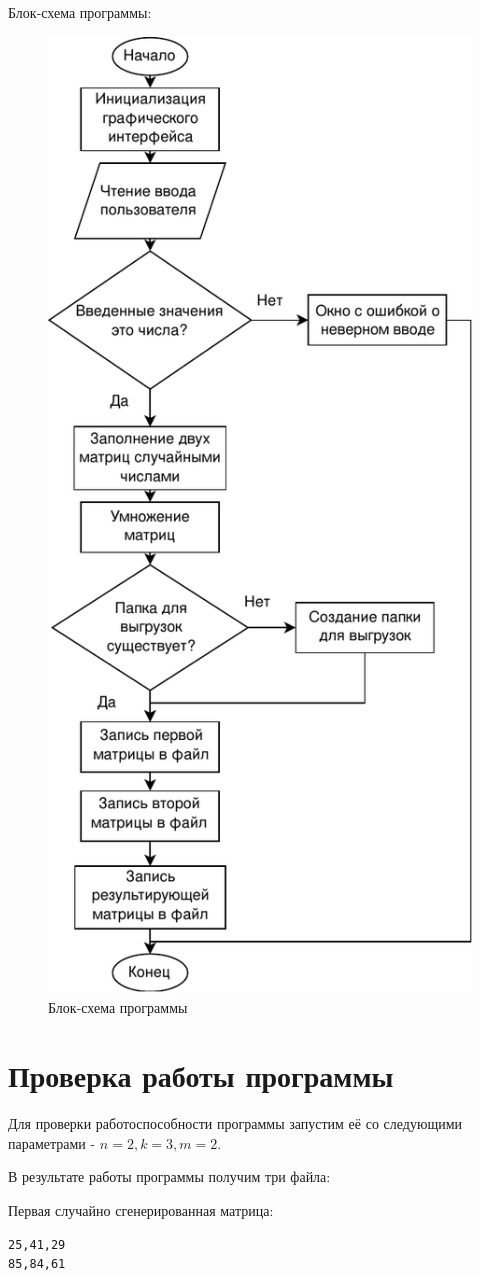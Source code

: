 \documentclass[a4paper,14pt]{extarticle}
\begin{document}
Блок-схема программы:
\begin{figure}[H]
	\includegraphics[height=1.5\textwidth, width=\textwidth]{include/exported_diag.pdf}
	\caption{Блок-схема программы}
\end{figure}

\section{Проверка работы программы}
Для проверки работоспособности программы запустим её со следующими параметрами - 
$n = 2, k = 3, m = 2$.

В результате работы программы получим три файла:

Первая случайно сгенерированная матрица:
\begin{verbatim}
25,41,29
85,84,61
\end{verbatim}
\end{document}

